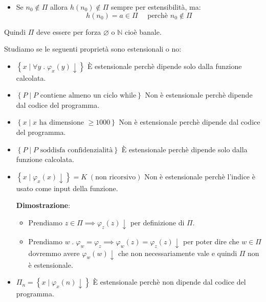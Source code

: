 \documentclass[a4paper]{article}
\begin{document}
\begin{theorem}
\begin{itemize}
    \item Se \( n_0 \notin \Pi \) allora \( h(n_0) \notin \Pi \) sempre per estensibilità,
      ma:
      \[
        h(n_0) = a \in \Pi \quad \text{ perchè } n_0 \notin \Pi
      \] 
  \end{itemize}
  Quindi \( \Pi  \) deve essere per forza \( \varnothing \) o \( \mathbb{N} \) 
  cioè banale.
\end{theorem}

\begin{example}
  Studiamo se le seguenti proprietà sono estensionali o no:
  \begin{itemize}
    \item \( \left\{ \left. x \;\right|\; \forall y \;.\; \varphi_x(y) \downarrow \right\} \)
        È estensionale perchè dipende solo dalla funzione calcolata.
    \item \( \left\{ \left. P \;\right|\; P \text{ contiene almeno un ciclo while} \right\} \)
        Non è estensionale perchè dipende dal codice del programma.
    \item \( \left\{ \left. x \;\right|\; x \text{ ha dimensione } \ge 1000 \right\} \)
        Non è estensionale perchè dipende dal codice del programma.
    \item \( \left\{ \left. P \;\right|\; P \text{ soddisfa confidenzialità} \right\} \)
        È estensionale perchè dipende solo dalla funzione calcolata.
    \item \( \left\{ \left. x \;\right|\; \varphi_x(x)\downarrow \right\} = K \;(\text{non ricorsivo})\)
        Non è estensionale perchè l'indice è usato come input della funzione.

        \vspace{1em}
        \noindent
        \textbf{Dimostrazione}: 
        \begin{itemize}
          \item 
            Prendiamo \( z \in \Pi \implies \varphi_z(z) \downarrow\) per
            definizione di \( \Pi  \).

          \item Prendiamo \( w \;.\; \varphi_w = \varphi_z \implies \varphi_w(z) = \varphi_z(z) \downarrow \) 
            per poter dire che \( w \in \Pi  \) dovremmo avere \( \varphi_w(w) \downarrow \) che non
            necessariamente vale e quindi \( \Pi  \) non è estensionale.
        \end{itemize}

      \item \( \Pi_n = \left\{ \left. x \;\right|\; \varphi_x(n) \downarrow \right\} \)
          È estensionale perchè non dipende dal codice del programma.
  \end{itemize}
\end{example}
\end{document}
